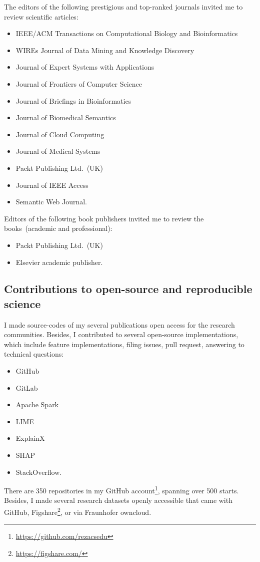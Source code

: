 \begin{appendices}
The editors of the following prestigious and top-ranked journals invited me to review scientific articles: 

\begin{itemize}[noitemsep]
    \item IEEE/ACM Transactions on Computational Biology and Bioinformatics
    \item WIREs Journal of Data Mining and Knowledge Discovery
    \item Journal of Expert Systems with Applications 
    \item Journal of Frontiers of Computer Science
    \item Journal of Briefings in Bioinformatics
    \item Journal of Biomedical Semantics
    \item Journal of Cloud Computing
    \item Journal of Medical Systems
    \item Packt Publishing Ltd.~(UK)
    \item Journal of IEEE Access 
    \item Semantic Web Journal.
\end{itemize}

Editors of the following book publishers invited me to review the books~(academic and professional): 

\begin{itemize}[noitemsep]
    \item Packt Publishing Ltd.~(UK)
    \item Elsevier academic publisher. 
\end{itemize}

\subsection*{Contributions to open-source and reproducible science %
}%
I made source-codes of my several publications open access for the research communities. Besides, I contributed to several open-source implementations, which include feature implementations, filing issues, pull request, answering to technical questions: 

\begin{itemize}[noitemsep]
    \item GitHub
    \item GitLab
    \item Apache Spark 
    \item LIME
    \item ExplainX
    \item SHAP
    \item StackOverflow.
\end{itemize}

There are 350 repositories in my GitHub account\footnote{\url{https://github.com/rezacsedu}}, spanning over 500 starts. Besides, I made several research datasets openly accessible that came with GitHub, Figshare\footnote{\url{https://figshare.com/}}, or via Fraunhofer owncloud.

\end{appendices}